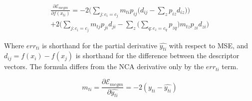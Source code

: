 \begin{multline}
\label{eq:megm_grad}
\frac{\partial \mathcal{E}_{megm}}{\partial f(x_{ti})} = 
  -2 \bigg( \sum_{j:c_i = c_j}  m_{ti} {p_{ij} \Big( d_{ij} - \sum_z{p_{iz}d_{iz}} \Big) } \bigg)\\
  +2 \bigg( \sum_{j:c_i = c_j} m_{tj}{p_{ji}d_{ji} - \sum_z{\Big( \sum_{q:c_z = c_q}{p_{zq}} \Big) m_{tz}p_{zi}d_{zi}   }} \bigg)
\end{multline}

Where $ err_{ti} $ is shorthand for the partial derivative $ \hat{y_{ti}} $ with respect to \gls{MSE}, and $ d_{ij} = f(x_i) - f(x_j) $ is shorthand for the difference between the descriptor vectors. The formula differs from the \gls{NCA} derivative only by the $ err_{ti} $ term.

\begin{equation}
m_{ti} = \frac{\partial \mathcal{E}_{megm}}{\partial \hat{y_{ti}}} = -2 (y_{ti} - \hat{y_{ti}})
\label{eq:megm_partial}
\end{equation}



